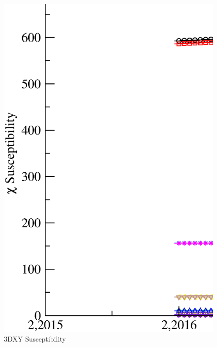 

\begin{figure}[!htpb]
  \centering
  \includegraphics[width=\textwidth]{./plots/3DXY/vsT/Susceptibility.eps}
  \caption{3DXY Susceptibility}
\end{figure}


